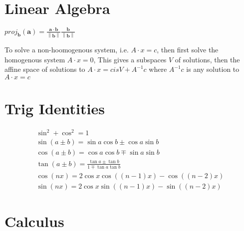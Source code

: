 
\section{Linear Algebra}

$proj_\mathbf{b}\left(\mathbf{a}\right) = \frac{\mathbf{a} \cdot \mathbf{b}}{\left\|\mathbf{b}\right\|}\frac{\mathbf{b}}{\left\|\mathbf{b}\right\|}$

To solve a non-hoomogenous system, i.e. $A\cdot x = c$, then first solve the homogenous system $A\cdot x = 0$, This gives a subspaces $V$ of solutions, then the affine space of solutions to $A\cdot x = c is V + A^{-1}c$ where $A^{-1}c$ is any solution to $A\cdot x = c$



\section{Trig Identities}
\begin{gather*}
  \sin^2 + \cos^2 = 1\\
  \sin\left(a \pm b\right) = \sin a\cos b \pm \cos a \sin b\\
  \cos\left(a \pm b\right) = \cos a\cos b \mp \sin a \sin b\\
  \tan\left(a \pm b\right) = \frac{\tan a \pm \tan b}{1\mp \tan a \tan b}\\
  \cos\left(nx\right) = 2 \cos x \cos \left(\left(n-1\right)x\right) - \cos\left(\left(n-2\right)x\right)\\
  \sin\left(nx\right) = 2 \cos x \sin \left(\left(n-1\right)x\right) - \sin\left(\left(n-2\right)x\right)
\end{gather*}



\section{Calculus}

